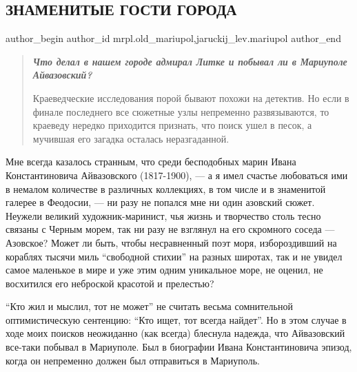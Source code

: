  
 
 
 
 
 
\subsection{ЗНАМЕНИТЫЕ ГОСТИ ГОРОДА}
\label{sec:14_07_2011.stz.mrpl.old_mariupol.1.znamenitye_gosti_goroda}
 
\ifcmt
 author_begin
   author_id mrpl.old_mariupol,jaruckij_lev.mariupol
 author_end
\fi

\begin{quote}
\em\bfseries
Что делал в нашем городе адмирал Литке и побывал ли в Мариуполе Айвазовский?

Краеведческие исследования порой бывают похожи на детектив. Но если в финале
пос­леднего все сюжетные узлы непременно развязываются, то краеведу нередко
приходится признать, что поиск ушел в песок, а мучившая его загадка осталась
неразгаданной.
\end{quote}

Мне всегда казалось странным, что среди бесподобных марин Ивана Константиновича
Айвазовского (1817-1900), — а я имел счастье любоваться ими в немалом
количестве в раз­личных коллекциях, в том числе и в знаменитой галерее в
Феодосии, — ни разу не попался мне ни один азовский сюжет. Неужели великий
художник-маринист, чья жизнь и творче­ство столь тесно связаны с Черным морем,
так ни разу не взглянул на его скромного соседа — Азовское? Может ли быть,
чтобы несравненный поэт моря, избороздивший на кораблях тысячи миль \enquote{свободной
стихии} на разных широтах, так и не увидел самое маленькое в мире и уже этим
одним уникальное море, не оценил, не восхитился его неброской красотой и
прелестью?

\enquote{Кто жил и мыслил, тот не может} не считать весьма сомнительной оптимистическую
сентенцию: \enquote{Кто ищет, тот всегда найдет}. Но в этом случае в ходе моих поисков
неожиданно (как всегда) блеснула надежда, что Айвазовский все-таки побывал в
Мариуполе. Был в биографии Ивана Константиновича эпизод, когда он непременно
должен был отправиться в Мариуполь.

